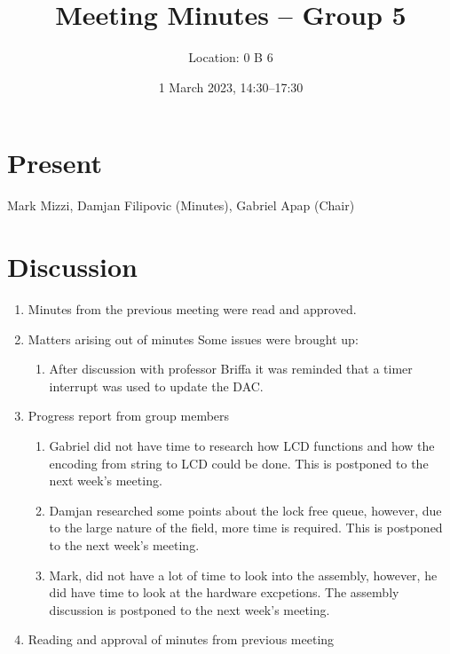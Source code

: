 \documentclass[11pt,a4paper]{scrartcl}
\title{Meeting Minutes -- Group 5}
\author{Location: 0 B 6}
\date{1 March 2023, 14:30--17:30}
\begin{document}
\maketitle

\section*{Present}
Mark Mizzi,
Damjan Filipovic (Minutes),
Gabriel Apap    (Chair)

\section*{Discussion}

\begin{enumerate}


\item Minutes from the previous meeting were read and approved.

\item Matters arising out of minutes
    Some issues were brought up:
    \begin{enumerate}
        \item After discussion with professor Briffa it was reminded that a timer interrupt was used to update the DAC.
    \end{enumerate}

\item Progress report from group members
   \begin{enumerate}
        \item Gabriel did not have time to research how LCD functions and how the encoding from string to LCD could be done. This is postponed to the next week's meeting.
        \item Damjan researched some points about the lock free queue, however, due to the large nature of the field, more time is required. This is postponed to the next week's meeting.
        \item Mark, did not have a lot of time to look into the assembly, however, he did have time to look at the hardware excpetions. 
            The assembly discussion is postponed to the next week's meeting.
   \end{enumerate}


\item Reading and approval of minutes from previous meeting


\end{enumerate}
\end{document}
